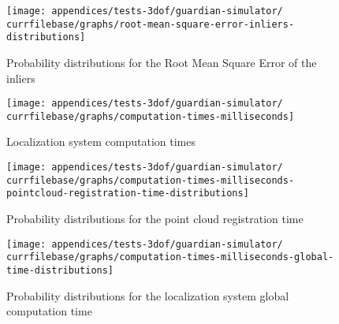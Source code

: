 \begin{figure}[H]
	\centering
	\texttt{[image: appendices/tests-3dof/guardian-simulator/\\currfilebase/graphs/root-mean-square-error-inliers-distributions]}
	\caption{Probability distributions for the Root Mean Square Error of the inliers}
\end{figure}


\begin{figure}[H]
	\centering
	\texttt{[image: appendices/tests-3dof/guardian-simulator/\\currfilebase/graphs/computation-times-milliseconds]}
	\caption{Localization system computation times}
\end{figure}

\begin{figure}[H]
	\centering
	\texttt{[image: appendices/tests-3dof/guardian-simulator/\\currfilebase/graphs/computation-times-milliseconds-pointcloud-registration-time-distributions]}
	\caption{Probability distributions for the point cloud registration time}
\end{figure}

\begin{figure}[H]
	\centering
	\texttt{[image: appendices/tests-3dof/guardian-simulator/\\currfilebase/graphs/computation-times-milliseconds-global-time-distributions]}
	\caption{Probability distributions for the localization system global computation time}
\end{figure}
